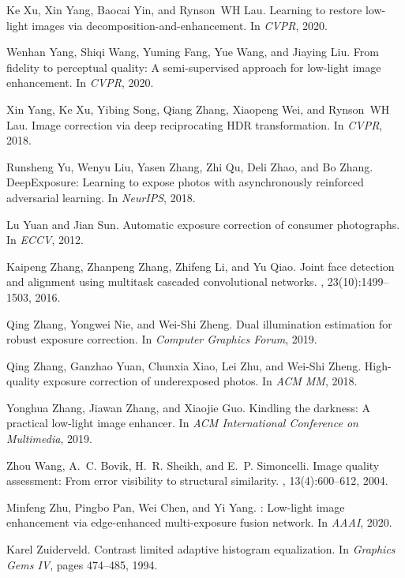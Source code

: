 \documentclass[final]{cvpr}
\begin{document}
{\begin{thebibliography}{10}
Ke Xu, Xin Yang, Baocai Yin, and Rynson~WH Lau.
\newblock Learning to restore low-light images via
  decomposition-and-enhancement.
\newblock In {\em CVPR}, 2020.

Wenhan Yang, Shiqi Wang, Yuming Fang, Yue Wang, and Jiaying Liu.
\newblock From fidelity to perceptual quality: A semi-supervised approach for
  low-light image enhancement.
\newblock In {\em CVPR}, 2020.

Xin Yang, Ke Xu, Yibing Song, Qiang Zhang, Xiaopeng Wei, and Rynson~WH Lau.
\newblock Image correction via deep reciprocating {H}{D}{R} transformation.
\newblock In {\em CVPR}, 2018.

Runsheng Yu, Wenyu Liu, Yasen Zhang, Zhi Qu, Deli Zhao, and Bo Zhang.
\newblock Deep{E}xposure: {L}earning to expose photos with asynchronously
  reinforced adversarial learning.
\newblock In {\em NeurIPS}, 2018.

Lu Yuan and Jian Sun.
\newblock Automatic exposure correction of consumer photographs.
\newblock In {\em ECCV}, 2012.

Kaipeng Zhang, Zhanpeng Zhang, Zhifeng Li, and Yu Qiao.
\newblock Joint face detection and alignment using multitask cascaded
  convolutional networks.
, 23(10):1499--1503, 2016.

Qing Zhang, Yongwei Nie, and Wei-Shi Zheng.
\newblock Dual illumination estimation for robust exposure correction.
\newblock In {\em Computer Graphics Forum}, 2019.

Qing Zhang, Ganzhao Yuan, Chunxia Xiao, Lei Zhu, and Wei-Shi Zheng.
\newblock High-quality exposure correction of underexposed photos.
\newblock In {\em ACM MM}, 2018.

Yonghua Zhang, Jiawan Zhang, and Xiaojie Guo.
\newblock Kindling the darkness: {A} practical low-light image enhancer.
\newblock In {\em ACM International Conference on Multimedia}, 2019.

{Zhou Wang}, A.~C. {Bovik}, H.~R. {Sheikh}, and E.~P. {Simoncelli}.
\newblock Image quality assessment: {F}rom error visibility to structural
  similarity.
, 13(4):600--612, 2004.

Minfeng Zhu, Pingbo Pan, Wei Chen, and Yi Yang.
: Low-light image enhancement via edge-enhanced
  multi-exposure fusion network.
\newblock In {\em AAAI}, 2020.

Karel Zuiderveld.
\newblock Contrast limited adaptive histogram equalization.
\newblock In {\em Graphics Gems IV}, pages 474--485, 1994.

\end{thebibliography}

}
\end{document}
